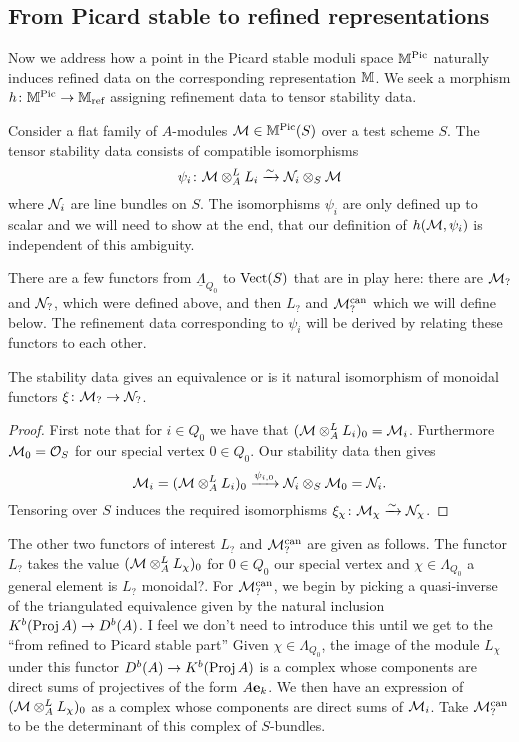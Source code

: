 \documentclass[12pt]{amsart}
\begin{document}
\subsection{From Picard stable to refined representations}
Now we address how a point in the Picard stable moduli space $\mathbb{M}^{\operatorname{Pic}}$ naturally induces refined data on the corresponding representation $\mathbb{M}$.
We seek a morphism $h \colon \mathbb{M}^{\operatorname{Pic}} \to \mathbb{M}_{\text{ref}}$ assigning refinement data to tensor stability data.

Consider a flat family of $A$-modules $\mathcal{M} \in \mathbb{M}^{\operatorname{Pic}}(S)$ over a test scheme $S$.
The tensor stability data consists of compatible isomorphisms 
$$\psi_i \colon \mathcal{M} \otimes_A^L L_i \xrightarrow{\sim} \mathcal{N}_i \otimes_S \mathcal{M}$$
where $\mathcal{N}_i$ are line bundles on $S$. 
The isomorphisms $\psi_i$ are only defined up to scalar and we will need to show at the end, that our definition of $h(\mathcal{M},\psi_i)$ is independent of this ambiguity.

There are a few functors from $\underline{\Lambda}_{Q_0}$ to $\operatorname{Vect}(S)$ that are in play here: there are $\mathcal{M}_?$ and $\mathcal{N}_?$, which were defined above, and then $L_?$ and $\mathcal{M}_?^{\text{can}}$ which we will define below.
The refinement data corresponding to $\psi_i$ will be derived by relating these functors to each other.

\begin{lemma}\label{lm:equivNM}
The stability data gives an equivalence {\red or is it natural isomorphism} of monoidal functors  $\xi \colon \mathcal{M}_? \rightarrow \mathcal{N}_?$.
\end{lemma}

\begin{proof}
First note that for $i\in Q_0$ we have that $(\mathcal{M} \otimes_A^L L_i)_0 = \mathcal{M}_i$.
Furthermore $\mathcal{M}_0 = \mathcal{O}_S$ for our special vertex $0\in Q_0$.
Our stability data then gives
$$\mathcal{M}_i = (\mathcal{M} \otimes_A^L L_i)_0 \xrightarrow{\psi_{i,0}} \mathcal{N}_i \otimes_S \mathcal{M}_0 = \mathcal{N}_i.$$
Tensoring over $S$ induces the required isomorphisms $\xi_\chi \colon \mathcal{M}_\chi \xrightarrow{\sim} \mathcal{N}_\chi$.
\end{proof}

The other two functors of interest $L_?$ and $\mathcal{M}_?^{\text{can}}$ are given as follows.
The functor $L_?$ takes the value  $(\mathcal{M} \otimes_A^L L_\chi)_0$ for $0 \in Q_0$ our special vertex and $\chi \in \Lambda_{Q_0}$ a general element {\red is $L_?$ monoidal?}.
For $\mathcal{M}_?^{\text{can}}$, we begin by picking a quasi-inverse of the triangulated equivalence given by the natural inclusion $K^b(\operatorname{Proj} A) \rightarrow D^b(A)$. {\red I feel we don't need to introduce this until we get to the ``from refined to Picard stable part''} 
Given $\chi \in \Lambda_{Q_0}$, the image of the module $L_\chi$ under this functor $D^b(A) \rightarrow K^b(\operatorname{Proj} A)$ is a complex whose components are direct sums of projectives of the form $A\mathbf{e}_k$.
We then have an expression of $(\mathcal{M} \otimes_A^L L_\chi)_0$ as a complex whose components are direct sums of $\mathcal{M}_i$.
Take $\mathcal{M}_?^{\text{can}}$ to be the determinant of this complex of $S$-bundles.
\end{document}
